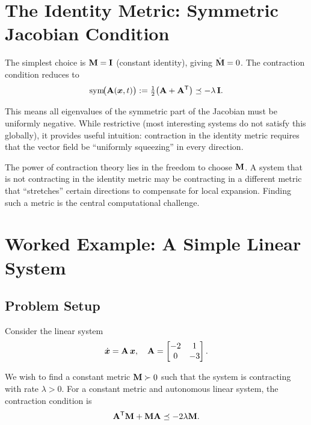 \section{The Identity Metric: Symmetric Jacobian Condition}

The simplest choice is $\mathbf{M} = \mathbf{I}$ (constant identity), giving
$\dot{\mathbf{M}}=0$. The contraction condition reduces to
\begin{equation}
\operatorname{sym}\!\bigl(\mathbf{A}(\bm{x},t)\bigr) := \tfrac{1}{2}\!\left(\mathbf{A}+\mathbf{A}^{\mathsf{T}}\right)
\preceq -\lambda\,\mathbf{I}.
\label{eq:ch4:symmetric-condition}
\end{equation}

This means all eigenvalues of the symmetric part of the Jacobian must be uniformly
negative. While restrictive (most interesting systems do not satisfy this globally),
it provides useful intuition: contraction in the identity metric requires that the
vector field be ``uniformly squeezing'' in every direction.

\begin{remark}
The power of contraction theory lies in the freedom to choose $\mathbf{M}$. A system that
is not contracting in the identity metric may be contracting in a different metric that
``stretches'' certain directions to compensate for local expansion. Finding such a metric
is the central computational challenge.
\end{remark}


\section{Worked Example: A Simple Linear System}

\subsection{Problem Setup}

Consider the linear system
\begin{equation}
\dot{\bm{x}} = \mathbf{A}\,\bm{x}, \quad \mathbf{A} = \begin{bmatrix} -2 & 1 \\ 0 & -3 \end{bmatrix}.
\label{eq:ch4:example-system}
\end{equation}

We wish to find a constant metric $\mathbf{M} \succ 0$ such that the system is contracting
with rate $\lambda > 0$. For a constant metric and autonomous linear system, the
contraction condition is
\begin{equation}
\mathbf{A}^{\mathsf{T}} \mathbf{M} + \mathbf{M} \mathbf{A} \preceq -2\lambda \mathbf{M}.
\label{eq:ch4:example-LMI}
\end{equation}

